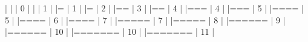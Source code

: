 \documentclass[10pt]{article}
\newenvironment{CodeChunk}{}{}
\begin{document}
\begin{CodeChunk}
\begin{CodeChunk}
\begin{CodeOutput}
  |                                                                       
  |                                                                 |   0%
  |                                                                       
  |                                                                 |   1%
  |                                                                       
  |=                                                                |   1%
  |                                                                       
  |=                                                                |   2%
  |                                                                       
  |==                                                               |   3%
  |                                                                       
  |==                                                               |   4%
  |                                                                       
  |===                                                              |   4%
  |                                                                       
  |===                                                              |   5%
  |                                                                       
  |====                                                             |   5%
  |                                                                       
  |====                                                             |   6%
  |                                                                       
  |====                                                             |   7%
  |                                                                       
  |=====                                                            |   7%
  |                                                                       
  |=====                                                            |   8%
  |                                                                       
  |======                                                           |   9%
  |                                                                       
  |======                                                           |  10%
  |                                                                       
  |=======                                                          |  10%
  |                                                                       
  |=======                                                          |  11%
  |                                                                       

\end{CodeOutput}
\end{CodeChunk}
\end{CodeChunk}
\end{document}
